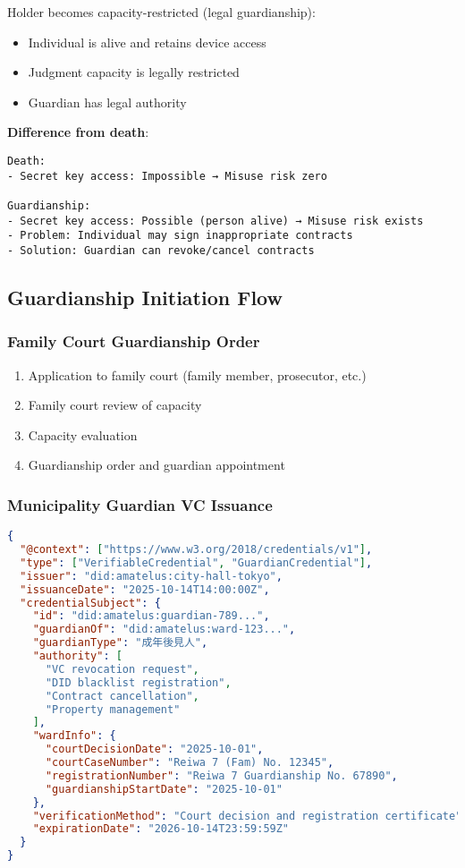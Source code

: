Holder becomes capacity-restricted (legal guardianship):
\begin{itemize}
  \item Individual is alive and retains device access
  \item Judgment capacity is legally restricted
  \item Guardian has legal authority
\end{itemize}

\textbf{Difference from death}:

\begin{verbatim}
Death:
- Secret key access: Impossible → Misuse risk zero

Guardianship:
- Secret key access: Possible (person alive) → Misuse risk exists
- Problem: Individual may sign inappropriate contracts
- Solution: Guardian can revoke/cancel contracts
\end{verbatim}

\subsection{Guardianship Initiation Flow}

\subsubsection{Family Court Guardianship Order}

\begin{enumerate}
  \item Application to family court (family member, prosecutor, etc.)
  \item Family court review of capacity
  \item Capacity evaluation
  \item Guardianship order and guardian appointment
\end{enumerate}

\subsubsection{Municipality Guardian VC Issuance}

\begin{lstlisting}[language=json]
{
  "@context": ["https://www.w3.org/2018/credentials/v1"],
  "type": ["VerifiableCredential", "GuardianCredential"],
  "issuer": "did:amatelus:city-hall-tokyo",
  "issuanceDate": "2025-10-14T14:00:00Z",
  "credentialSubject": {
    "id": "did:amatelus:guardian-789...",
    "guardianOf": "did:amatelus:ward-123...",
    "guardianType": "成年後見人",
    "authority": [
      "VC revocation request",
      "DID blacklist registration",
      "Contract cancellation",
      "Property management"
    ],
    "wardInfo": {
      "courtDecisionDate": "2025-10-01",
      "courtCaseNumber": "Reiwa 7 (Fam) No. 12345",
      "registrationNumber": "Reiwa 7 Guardianship No. 67890",
      "guardianshipStartDate": "2025-10-01"
    },
    "verificationMethod": "Court decision and registration certificate",
    "expirationDate": "2026-10-14T23:59:59Z"
  }
}
\end{lstlisting}

